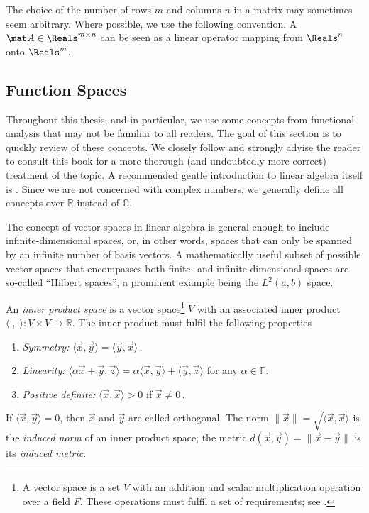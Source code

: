 The choice of the number of rows $m$ and columns $n$ in a matrix may sometimes seem arbitrary.
Where possible, we use the following convention.
A $\mat A \in \Reals^{m \times n}$ can be seen as a linear operator mapping from $\Reals^{n}$ onto $\Reals^{m}$.


\subsection{Function Spaces}
\label{app:functional_analysis}

Throughout this thesis, and  in particular, we use some concepts from functional analysis that may not be familiar to all readers.
The goal of this section is to quickly review of these concepts.
We closely follow \citet{young1988introduction} and strongly advise the reader to consult this book for a more thorough (and undoubtedly more correct) treatment of the topic.
A recommended gentle introduction to linear algebra itself is \citet{hefferon2020linear}.
Since we are not concerned with complex numbers, we generally define all concepts over $\mathbb{R}$ instead of $\mathbb{C}$.

The concept of vector spaces in linear algebra is general enough to include infinite-dimensional spaces, or, in other words, spaces that can only be spanned by an infinite number of basis vectors.
A mathematically useful subset of possible vector spaces that encompasses both finite- and infinite-dimensional spaces are so-called \enquote{Hilbert spaces}, a prominent example being the $L^2(a, b)$ space.

\begin{definition}
 	An \emph{inner product space} is a vector space\footnote{A vector space is a set $V$ with an addition and scalar multiplication operation over a field $F$. These operations must fulfil a set of requirements; see \cite[Definition 1.1]{hefferon2020linear}.} $V$ with an associated inner product $\langle \cdot, \cdot \rangle : V \times V \longrightarrow \mathbb{R}$. The inner product must fulfil the following properties
 	\begin{enumerate}
 		\item \emph{Symmetry:} $\langle \vec x, \vec y \rangle = \langle \vec y, \vec x \rangle\,$.
 		\item \emph{Linearity:} $\langle \alpha \vec x + \vec y, \vec z \rangle = \alpha \langle \vec x, \vec y \rangle + \langle \vec y, \vec z \rangle$ for any $\alpha \in \mathbb{F}$.
 		\item \emph{Positive definite:} $\langle \vec x, \vec x \rangle > 0$ if $\vec x \neq 0\,$.
 	\end{enumerate}
 	If $\langle \vec x, \vec y \rangle = 0$, then $\vec x$ and $\vec y$ are called orthogonal. The norm $\|\vec x\| = \sqrt{\langle \vec x, \vec x \rangle}$ is the \emph{induced norm} of an inner product space; the metric $d(\vec x, \vec y) = \|\vec x - \vec y\|$ is its \emph{induced metric}.
\end{definition}

